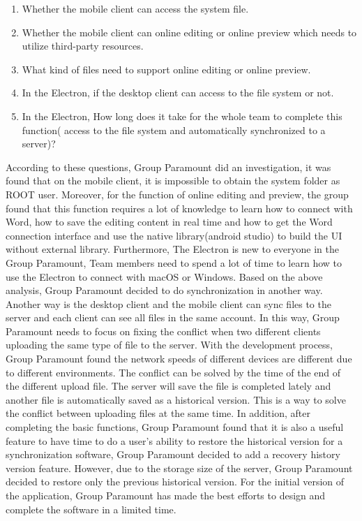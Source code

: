 \documentclass[11pt]{article}
\begin{document}
\begin{enumerate}
	\item Whether the mobile client can access the system file.
	\item Whether the mobile client can online editing or online preview which needs to utilize third-party resources.
	\item What kind of files need to support online editing or online preview.
	\item In the Electron,  if the desktop client can access to the file system or not.
	\item In the Electron,  How long does it take for the whole team to complete this function( access to the file system and automatically synchronized to a server)? 
\end{enumerate}

According to these questions, Group Paramount did an investigation, it was found that on the mobile client, it is impossible to obtain the system folder as ROOT user. Moreover, for the function of online editing and preview, the group found that this function requires a lot of knowledge to learn how to connect with Word, how to save the editing content in real time and how to get the Word connection interface and use the native library(android studio) to build the UI without external library. Furthermore, The Electron is new to everyone in the Group Paramount, Team members need to spend a lot of time to learn how to use the Electron to connect with macOS or Windows. Based on the above analysis, Group Paramount decided to do synchronization in another way. Another way is the desktop client and the mobile client can sync files to the server and each client can see all files in the same account. In this way, Group Paramount needs to focus on fixing the conflict when two different clients uploading the same type of file to the server. With the development process, Group Paramount found the network speeds of different devices are different due to different environments. The conflict can be solved by the time of the end of the different upload file. The server will save the file is completed lately and another file is automatically saved as a historical version. This is a way to solve the conflict between uploading files at the same time. In addition, after completing the basic functions, Group Paramount found that it is also a useful feature to have time to do a user's ability to restore the historical version for a synchronization software, Group Paramount decided to add a recovery history version feature. However, due to the storage size of the server, Group Paramount decided to restore only the previous historical version. For the initial version of the application, Group Paramount has made the best efforts to design and complete the software in a limited time.
\end{document}
